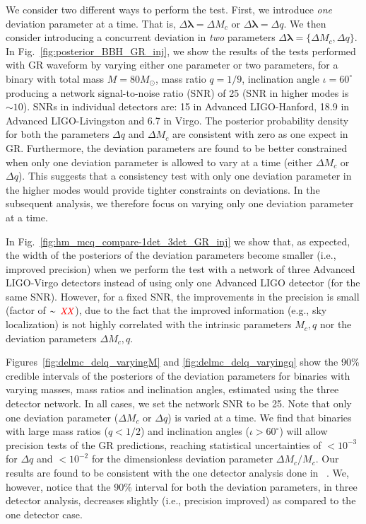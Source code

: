 \documentclass[prd,preprintnumbers,twocolumn,eqsecnum,floatfix,a4paper,nofootinbib,superscriptaddress]{revtex4}
\newcommand{\red}[1]{\textcolor{red}{#1}}
\newcommand{\blambda}{\bm{\lambda}}
\begin{document}
We consider two different ways to perform the test. First, we introduce \emph{one} deviation parameter at a time. That is, $\Delta\blambda = {\Delta M_c}$ or $\Delta\blambda = {\Delta q}$. We then consider introducing a concurrent deviation in \emph{two} parameters $\Delta \blambda = \{\Delta M_c, \Delta q\}$. In Fig.~\ref{fig:posterior_BBH_GR_inj}, we show the results of the tests performed with GR waveform by varying either one parameter or two parameters, for a binary with total mass $M = 80M_{\odot}$, mass ratio $q=1/9$, inclination angle $ {\iota}=60^{\circ} $ producing a network signal-to-noise ratio  (SNR)  of 25 (SNR in higher modes is $\sim 10$). SNRs in individual detectors are: 15 in Advanced LIGO-Hanford, 18.9 in Advanced LIGO-Livingston and 6.7 in Virgo. The posterior probability density for both the parameters $\Delta q$ and $\Delta M_c$ are consistent with zero as one expect in GR. Furthermore, the deviation parameters are found to be better constrained when only one deviation parameter is allowed to vary at a time (either $\Delta M_c$ or $\Delta q$). This suggests that a consistency test with only one deviation parameter in the higher modes would provide tighter constraints on deviations. In the subsequent analysis, we therefore focus on varying only one deviation parameter at a time. 

In Fig.~\ref{fig:hm_mcq_compare-1det_3det_GR_inj} we show that, as expected, the width of the posteriors of the deviation parameters become smaller (i.e., improved precision) when we perform the test with a network of three Advanced LIGO-Virgo detectors instead of using only one Advanced LIGO detector (for the same SNR). However, for a fixed SNR, the improvements in the precision is small (factor of $\sim ~\red{XX}$), due to the fact that the improved information (e.g., sky localization) is not highly correlated with the intrinsic parameters $M_c, q$ nor the deviation parameters $\Delta M_c, q$. 

Figures~\ref{fig:delmc_delq_varyingM} and \ref{fig:delmc_delq_varyingq} show the 90\% credible intervals of the posteriors of the deviation parameters for binaries with varying masses, mass ratios and inclination angles, estimated using the three detector network. In all cases, we set the network SNR to be {25}. Note that only one deviation parameter ($\Delta M_c$ or $\Delta q$) is varied at a time.  We find that binaries with large mass ratios ($q < 1/ 2$) and inclination angles ($\iota > 60 ^\circ $) will allow precision tests of the GR predictions, reaching statistical uncertainties of $< 10^{-3}$ for $\Delta q$ and $< 10^{-2}$ for the dimensionless deviation parameter $\Delta M_c/M_c$. Our results are found to be consistent with the one detector analysis done in ~\cite{Dhanpal:2018ufk}. We, however, notice that the 90\% interval for both the deviation parameters, in three detector analysis, decreases slightly (i.e., precision improved) as compared to the one detector case.
 
\end{document}
